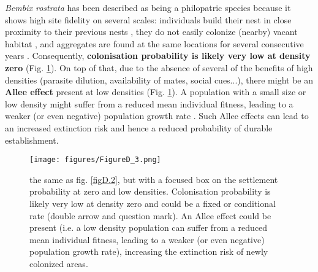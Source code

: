 \documentclass[10pt, twoside]{book} %
\begin{document}
	\textit{Bembix rostrata} has been described as being a philopatric species because it shows high site fidelity on several scales: individuals build their nest in close proximity to their previous nests \citep[chapter \ref{chapter2}; ][]{larsson1989}, they do not easily colonize (nearby) vacant habitat \citep{nielsen1945, blosch2000, bogusch2021}, and aggregates are found at the same locations for several consecutive years \citep{nielsen1945}. Consequently, \textbf{colonisation probability is likely very low at density zero} (Fig. \ref{figD.3}). On top of that, due to the absence of several of the benefits of high densities (parasite dilution, availability of mates, social cues...), there might be an \textbf{Allee effect} present at low densities (Fig. \ref{figD.3}). A population with a small size or low density might suffer from a reduced mean individual fitness, leading to a weaker (or even negative) population growth rate \citep{stephens1999a, stephens1999}. Such Allee effects can lead to an increased extinction risk and hence a reduced probability of durable establishment.\\
	
	\begin{figure}[ht!]
		\begin{center}
			\texttt{[image: figures/FigureD\_3.png]}
		\end{center}
		\begin{footnotesize}
			\caption{the same as fig. \ref{figD.2}, but with a focused box on the settlement probability at zero and low densities. Colonisation probability is likely very low at density zero and could be a fixed or conditional rate (double arrow and question mark). An Allee effect could be present (i.e. a low density population can suffer from a reduced mean individual fitness, leading to a weaker (or even negative) population growth rate), increasing the extinction risk of newly colonized areas. \label{figD.3}}
		\end{footnotesize}
	\end{figure}	
	
\end{document}
